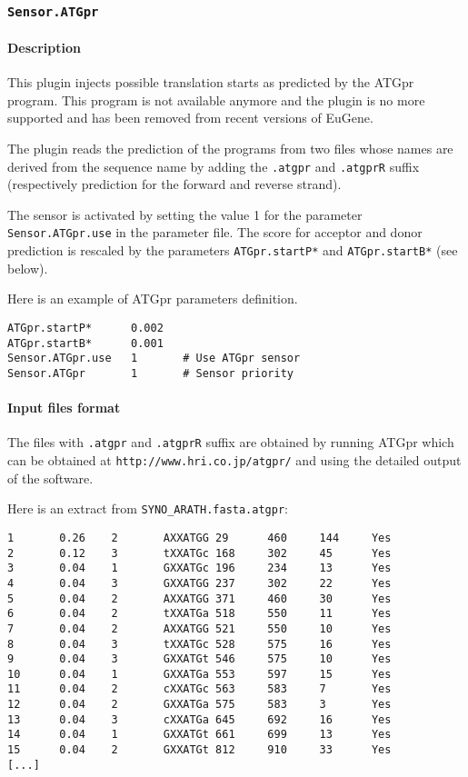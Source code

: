 
\subsubsection{\texttt{Sensor.ATGpr}}

\paragraph{Description}

This plugin injects possible translation starts as predicted by the
ATGpr program. This program is not available anymore and the plugin is 
no more supported and has been removed from recent versions of EuGene.

The plugin reads the prediction of the programs from two files whose
names are derived from the sequence name by adding the \texttt{.atgpr}
and \texttt{.atgprR} suffix (respectively prediction for the forward
and reverse strand).

The sensor is activated by setting the value 1 for the parameter
\texttt{Sensor.ATGpr.use} in the parameter file. The score for acceptor
and donor prediction is rescaled by the parameters {\tt ATGpr.startP*} and
{\tt ATGpr.startB*} (see below).

Here is an example of ATGpr parameters definition.
\begin{Verbatim}[fontsize=\small]
ATGpr.startP*      0.002
ATGpr.startB*      0.001
Sensor.ATGpr.use   1       # Use ATGpr sensor
Sensor.ATGpr       1       # Sensor priority
\end{Verbatim}

\paragraph{Input files format}

The files with \texttt{.atgpr} and \texttt{.atgprR} suffix are
obtained by running ATGpr which can be obtained at
\texttt{http://www.hri.co.jp/atgpr/} and using the
detailed output of the software.

Here is an extract from \texttt{SYNO\_ARATH.fasta.atgpr}:
\begin{Verbatim}[fontsize=\small]
1       0.26    2       AXXATGG 29      460     144     Yes     
2       0.12    3       tXXATGc 168     302     45      Yes     
3       0.04    1       GXXATGc 196     234     13      Yes     
4       0.04    3       GXXATGG 237     302     22      Yes     
5       0.04    2       AXXATGG 371     460     30      Yes     
6       0.04    2       tXXATGa 518     550     11      Yes     
7       0.04    2       AXXATGG 521     550     10      Yes     
8       0.04    3       tXXATGc 528     575     16      Yes     
9       0.04    3       GXXATGt 546     575     10      Yes     
10      0.04    1       GXXATGa 553     597     15      Yes     
11      0.04    2       cXXATGc 563     583     7       Yes     
12      0.04    2       GXXATGa 575     583     3       Yes     
13      0.04    3       cXXATGa 645     692     16      Yes     
14      0.04    1       GXXATGt 661     699     13      Yes     
15      0.04    2       GXXATGt 812     910     33      Yes     
[...]
\end{Verbatim}

